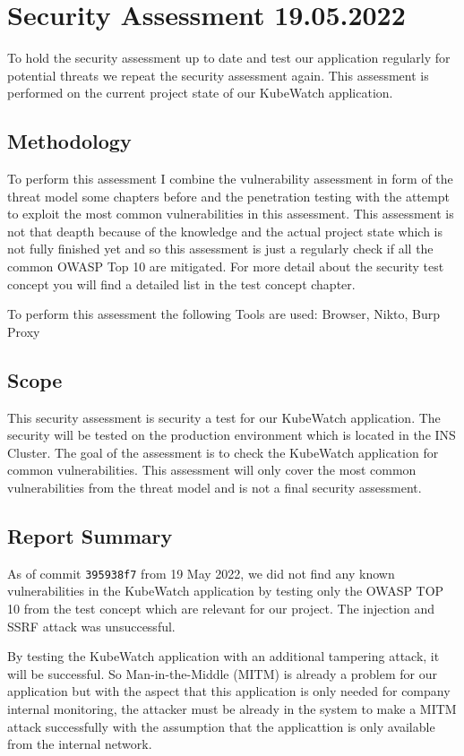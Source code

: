 \chapter{Security Assessment 19.05.2022}
To hold the security assessment up to date and test our application regularly for potential threats we repeat the security assessment again. This assessment is performed on the current project state of our KubeWatch application.

\section{Methodology}
To perform this assessment I combine the vulnerability assessment in form of the threat model some chapters before and the penetration testing with the attempt to exploit the most common vulnerabilities in this assessment. 
This assessment is not that deapth because of the knowledge and the actual project state which is not fully finished yet and so this assessment is just a regularly check if all the common OWASP Top 10 are mitigated. For more detail about the security test concept you will find a detailed list in the test concept chapter.

To perform this assessment the following Tools are used: Browser, Nikto, Burp Proxy

\section{Scope}
This security assessment is security a test for our KubeWatch application. The security will be tested on the production environment which is located in the INS Cluster.
The goal of the assessment is to check the KubeWatch application for common vulnerabilities. This assessment will only cover the most common vulnerabilities from the threat model and is not a final security assessment.

\section{Report Summary}
As of commit \lstinline "395938f7" from 19 May 2022, we did not find any known vulnerabilities in the KubeWatch application by testing only the OWASP TOP 10 from the test concept which are relevant for our project. The injection and SSRF attack was unsuccessful.

By testing the KubeWatch application with an additional tampering attack, it will be successful. So Man-in-the-Middle (MITM) is already a problem for our application but with the aspect that this application is only needed for company internal monitoring, the attacker must be already in the system to make a MITM attack successfully with the assumption that the applicattion is only available from the internal network. 

